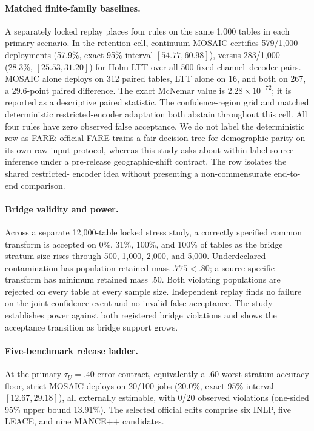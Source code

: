 \paragraph{Matched finite-family baselines.}
A separately locked replay places four rules on the same 1,000 tables in each
primary scenario. In the retention cell, continuum MOSAIC certifies 579/1,000
deployments (57.9\%, exact 95\% interval $[54.77,60.98]$), versus 283/1,000
(28.3\%, $[25.53,31.20]$) for Holm LTT over all 500 fixed
channel--decoder pairs. MOSAIC alone deploys on 312 paired tables, LTT alone on
16, and both on 267, a 29.6-point paired difference. The exact McNemar value
is $2.28\times10^{-72}$; it is reported as a descriptive paired statistic.
The confidence-region grid and matched deterministic restricted-encoder
adaptation both abstain throughout this cell. All four rules have zero observed
false acceptance. We do not label the deterministic row as FARE: official FARE
trains a fair decision tree for demographic parity on its own raw-input
protocol, whereas this study asks about within-label source inference under a
pre-release geographic-shift contract. The row isolates the shared restricted-
encoder idea without presenting a non-commensurate end-to-end comparison.

\paragraph{Bridge validity and power.}
Across a separate 12,000-table locked stress study, a correctly specified
common transform is accepted on 0\%, 31\%, 100\%, and 100\% of tables as the
bridge stratum size rises through 500, 1,000, 2,000, and 5,000. Underdeclared
contamination has population retained mass $.775<.80$; a source-specific
transform has minimum retained mass $.50$. Both violating populations are
rejected on every table at every sample size. Independent replay finds no
failure on the joint confidence event and no invalid false acceptance. The
study establishes power against both registered bridge violations and shows the
acceptance transition as bridge support grows.

\paragraph{Five-benchmark release ladder.}
At the primary $\tau_U=.40$ error contract, equivalently a $.60$
worst-stratum accuracy floor, strict MOSAIC deploys on 20/100 jobs
(20.0\%, exact 95\% interval $[12.67,29.18]$), all externally estimable, with
0/20 observed violations (one-sided 95\% upper bound 13.91\%). The selected
official edits comprise six INLP, five LEACE, and nine MANCE++ candidates.

